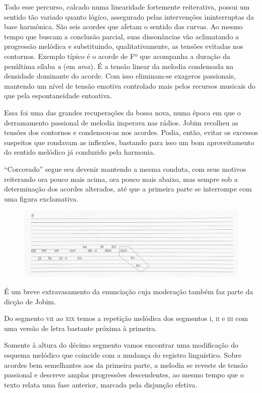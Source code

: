Todo esse percurso, calcado numa linearidade fortemente reiterativa,
possui um sentido tão variado quanto lógico, assegurado pelas
intervenções ininterruptas da base harmônica. São seis acordes que
afetam o sentido das curvas. Ao mesmo tempo que buscam a conclusão
parcial, suas dissonâncias vão aclimatando a progressão melódica e
substituindo, qualitativamente, as tensões evitadas nos contornos.
Exemplo típico é o acorde de Fº que acompanha a duração da penúltima
sílaba \textit{a} (em \textit{ama}). É a tensão linear da melodia condensada na
densidade dominante do acorde. Com isso eliminam-se exageros passionais,
mantendo um nível de tensão emotiva controlado mais pelos recursos
musicais do que pela espontaneidade entoativa.

Essa foi uma das grandes recuperações da bossa nova, numa época em que o
derramamento passional de melodia imperava nas rádios. Jobim recolheu as
tensões dos contornos e condensou-as nos acordes. Podia, então, evitar
os excessos suspeitos que rondavam as inflexões, bastando para isso um
bom aproveitamento do sentido melódico já conduzido pela harmonia.

``Corcovado'' segue seu devenir mantendo a mesma conduta, com seus motivos
reiterando ora pouco mais acima, ora pouco mais abaixo, mas sempre sob a
determinação dos acordes alterados, até que a primeira parte se
interrompe com uma figura exclamativa.

\begin{figure}[H]
\includegraphics[width=\textwidth]{./imgs/figura11.jpg}
\end{figure}

É um breve extravasamento da enunciação cuja moderação também faz parte
da dicção de Jobim.

Do segmento \textsc{vii} ao \textsc{xix} temos a repetição melódica dos segmentos \textsc{i}, \textsc{ii} e \textsc{iii} com
uma versão de letra bastante próxima à primeira.

Somente à altura do décimo segmento vamos encontrar uma modificação do
esquema melódico que coincide com a mudança do registro linguístico.
Sobre acordes bem semelhantes aos da primeira parte, a melodia se
reveste de tensão passional e descreve amplas progressões descendentes,
ao mesmo tempo que o texto relata uma fase anterior, marcada pela
disjunção efetiva.


